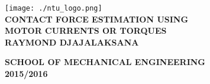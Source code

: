 \begin{titlepage}
\begin{center}

\texttt{[image: ./ntu\_logo.png]}
\\[5cm]

\uppercase{\textbf{Contact Force Estimation using \\Motor Currents or Torques}}
\\[5cm]

\uppercase{
\textbf{
Raymond Djajalaksana
}}

\vfill

\textsc{\bfseries SCHOOL OF MECHANICAL ENGINEERING}
\\
\textbf{2015/2016}

\end{center}
\end{titlepage}
